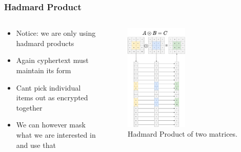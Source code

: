 \documentclass[aspectratio=169]{beamer}
\begin{document}
  \begin{frame}
    \frametitle{Hadmard Product}
    \begin{columns}
      \begin{column}{0.5\textwidth}
        \begin{itemize}
          \item Notice: we are only using hadmard products
          \item Again cyphertext must maintain its form
          \item Cant pick individual items out as encrypted together
          \item We can however mask what we are interested in and use that
        \end{itemize}
      \end{column}
      \begin{column}{0.5\textwidth}
        \begin{figure}[th!]
          \centering
          \includegraphics[width=0.5\textwidth]{hadmard_product.pdf}
          \caption{Hadmard Product of two matrices. \autocite{repository}}
          \label{fig:hadmard_product}
        \end{figure}
      \end{column}
    \end{columns}
  \end{frame}
\end{document}
